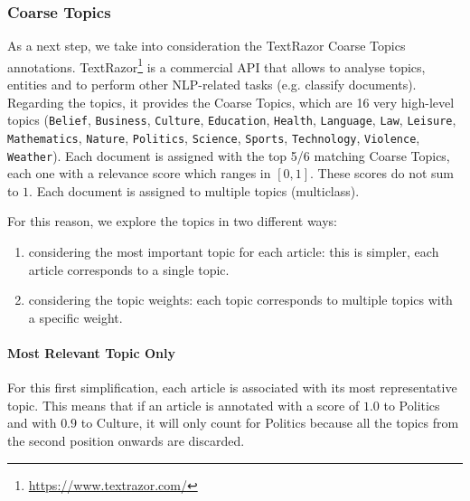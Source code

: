 \subsubsection{\statusgreen Coarse Topics}

As a next step, we take into consideration the TextRazor Coarse Topics annotations.
TextRazor\footnote{\url{https://www.textrazor.com/}} is a commercial API that allows to analyse topics, entities and to perform other NLP-related tasks (e.g. classify documents).
Regarding the topics, it provides the Coarse Topics, which are 16 very high-level topics (\texttt{Belief}, \texttt{Business}, \texttt{Culture}, \texttt{Education}, \texttt{Health}, \texttt{Language}, \texttt{Law}, \texttt{Leisure}, \texttt{Mathematics}, \texttt{Nature}, \texttt{Politics}, \texttt{Science}, \texttt{Sports}, \texttt{Technology}, \texttt{Violence}, \texttt{Weather}).
Each document is assigned with the top 5/6 matching Coarse Topics, each one with a relevance score which ranges in $[0,1]$. These scores do not sum to $1$. Each document is assigned to multiple topics (multiclass).

For this reason, we explore the topics in two different ways:

\begin{enumerate}
    \item considering the most important topic for each article: this is simpler, each article corresponds to a single topic.
    \item considering the topic weights: each topic corresponds to multiple topics with a specific weight.
\end{enumerate}

\paragraph{Most Relevant Topic Only}

For this first simplification, each article is associated with its most representative topic. This means that if an article is annotated with a score of $1.0$ to Politics and with $0.9$ to Culture, it will only count for Politics because all the topics from the second position onwards are discarded.



